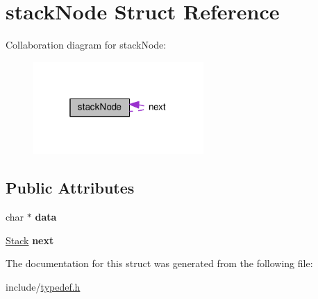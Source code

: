 \hypertarget{structstackNode}{}\section{stack\+Node Struct Reference}
\label{structstackNode}


Collaboration diagram for stack\+Node\+:
\nopagebreak
\begin{figure}[H]
\begin{center}
\leavevmode
\includegraphics[width=184pt]{structstackNode__coll__graph}
\end{center}
\end{figure}
\subsection*{Public Attributes}
\begin{DoxyCompactItemize}
\item 
char $\ast$ {\bfseries data}\hypertarget{structstackNode_ab8a7f2b607f656ddbdaed84d1c5acbae}{}\label{structstackNode_ab8a7f2b607f656ddbdaed84d1c5acbae}

\item 
\hyperlink{structstackNode}{Stack} {\bfseries next}\hypertarget{structstackNode_a7225663fc2f1d3bad4623de65857c461}{}\label{structstackNode_a7225663fc2f1d3bad4623de65857c461}

\end{DoxyCompactItemize}


The documentation for this struct was generated from the following file\+:\begin{DoxyCompactItemize}
\item 
include/\hyperlink{typedef_8h}{typedef.\+h}\end{DoxyCompactItemize}
